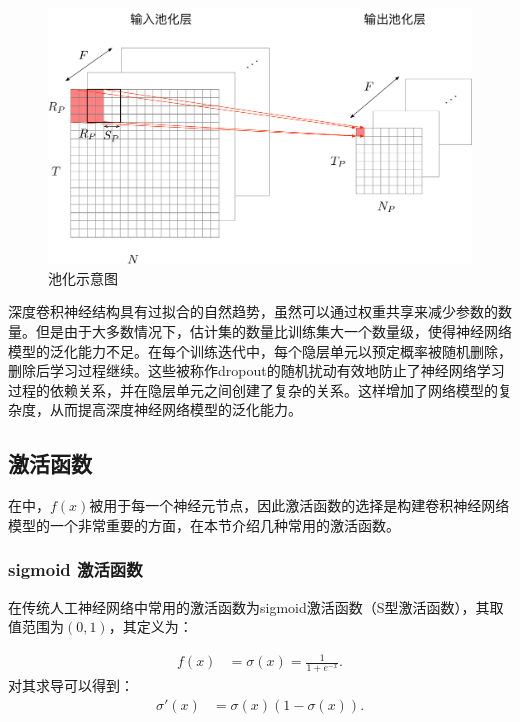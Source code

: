 \begin{figure}[hbt]
	\centering
	\includegraphics[width=13.5cm]{figures/networks/pooling}
	\caption{池化示意图}
	\label{fig:pool}
\end{figure}

深度卷积神经结构具有过拟合的自然趋势，虽然可以通过权重共享来减少参数的数量。但是由于大多数情况下，估计集的数量比训练集大一个数量级，使得神经网络模型的泛化能力不足。在每个训练迭代中，每个隐层单元以预定概率被随机删除，删除后学习过程继续。这些被称作dropout的随机扰动有效地防止了神经网络学习过程的依赖关系，并在隐层单元之间创建了复杂的关系。这样增加了网络模型的复杂度，从而提高深度神经网络模型的泛化能力。


\subsection{激活函数}

在中，$f(x)$被用于每一个神经元节点，因此激活函数的选择是构建卷积神经网络模型的一个非常重要的方面，在本节介绍几种常用的激活函数。

\subsubsection{sigmoid 激活函数}

在传统人工神经网络中常用的激活函数为sigmoid激活函数（S型激活函数），其取值范围为$(0,1)$，其定义为：

\begin{align}
f(x)&=\sigma(x)=\frac{1}{1+e^{-x}}.
\end{align}
对其求导可以得到：
\begin{align}
\sigma'(x)&=\sigma(x)\left(1-\sigma(x)\right).
\end{align}


